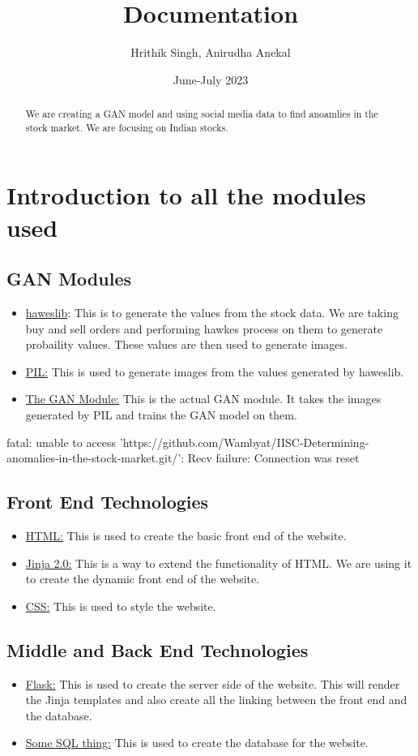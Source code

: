 \documentclass{article}
\begin{document}
\title{Documentation}
\author{Hrithik Singh, Anirudha Anekal}
\date{June-July 2023}
\maketitle
\begin{abstract}
We are creating a GAN model and using social media data to find anoamlies in the stock market. We are focusing on Indian stocks.
\end{abstract}
\section{Introduction to all the modules used}
\subsection{GAN Modules}
\begin{itemize}
\item \underline{haweslib}: This is to generate the values from the stock data. We are taking buy and sell orders and performing hawkes process on them to generate probaility values. These values are then used to generate images.
\item \underline{PIL:} This is used to generate images from the values generated by haweslib.
\item \underline{The GAN Module:} This is the actual GAN module. It takes the images generated by PIL and trains the GAN model on them.
\end{itemize}fatal: unable to access 'https://github.com/Wambyat/IISC-Determining-anomalies-in-the-stock-market.git/': Recv failure: Connection was reset
\subsection{Front End Technologies}
\begin{itemize}
\item \underline{HTML:} This is used to create the basic front end of the website.
\item \underline{Jinja 2.0:} This is a way to extend the functionality of HTML. We are using it to create the dynamic front end of the website.
\item \underline{CSS:} This is used to style the website.
\end{itemize}
\subsection{Middle and Back End Technologies}
\begin{itemize}
\item \underline{Flask:} This is used to create the server side of the website. This will render the Jinja templates and also create all the linking between the front end and the database.
\item \underline{Some SQL thing:} This is used to create the database for the website.
\end{itemize}
\end{document}
